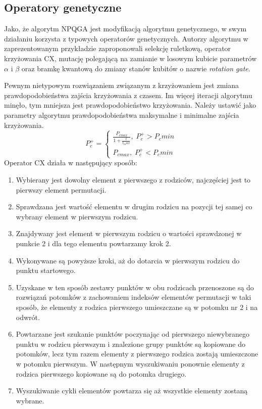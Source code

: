\subsection{Operatory genetyczne}
Jako, że algorytm NPQGA jest modyfikacją algorytmu genetycznego, w swym działaniu korzysta z typowych operatorów genetycznych. Autorzy algorytmu w  zaprezentowanym przykładzie zaproponowali selekcję ruletkową, operator krzyżowania CX, mutację polegającą na zamianie w losowym kubicie parametrów $\alpha$ i $\beta$ oraz bramkę kwantową do zmiany stanów kubitów o nazwie \textit{rotation gate}.

Pewnym nietypowym rozwiązaniem związanym z krzyżowaniem jest zmiana prawdopodobieństwa zajścia krzyżowania z czasem. Im więcej iteracji algorytmu minęło, tym mniejsza jest prawdopodobieństwo krzyżowania. Należy ustawić jako parametry algorytmu prawdopodobieństwa maksymalne i minimalne zajścia krzyżowania.
\newline
\begin{equation}
P_c^+= \left\{ \begin{array}{ccc} \frac{P_{c max}}{1+\frac{t}{t_max}}, \; P_c^+ > P_c min \\ P_{c max}, \; P_c^+ < P_c min \end{array} \right.
\end{equation}
\newline
Operator CX działa w następujący sposób:
\begin{enumerate}
\item Wybierany jest dowolny element z pierwszego z rodziców, najczęściej jest to pierwszy element permutacji.
\item Sprawdzana jest wartość elementu w drugim rodzicu na pozycji tej samej co wybrany element w pierwszym rodzicu.
\item Znajdywany jest element w pierwszym rodzicu o wartości sprawdzonej w punkcie 2 i dla tego elementu powtarzamy krok 2.
\item Wykonywane są powyższe kroki, aż do dotarcia w pierwszym rodzicu do punktu startowego.
\item Uzyskane w ten sposób zestawy punktów w obu rodzicach przenoszone są do rozwiązań potomków z zachowaniem indeksów elementów permutacji w taki sposób, że elementy z rodzica pierwszego umieszczane są w potomku nr 2 i na odwrót.
\item Powtarzane jest szukanie punktów poczynając od pierwszego niewybranego punktu w rodzicu pierwszym i znalezione grupy punktów są kopiowane do potomków, lecz tym razem elementy z pierwszego rodzica zostają umieszczone w potomku pierwszym. W następnym wyszukiwaniu ponownie elementy z rodzica pierwszego kopiowane są do potomka drugiego.
\item Wyszukiwanie cykli elementów powtarza się aż wszystkie elementy zostaną wybrane.
\end{enumerate}

